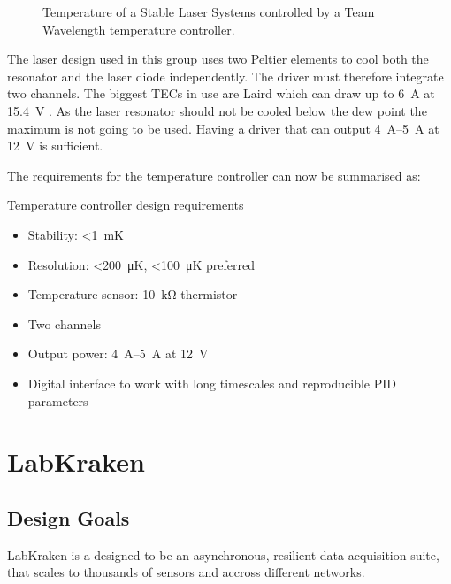 \begin{figure}[ht]
    \centering
    
    \caption{Temperature of a Stable Laser Systems  controlled by a Team Wavelength  temperature controller.}
    \label{fig:stability_cavity}
\end{figure}

The laser design used in this group uses two Peltier elements to cool both the resonator and the laser diode independently. The driver must therefore integrate two channels. The biggest TECs in use are Laird  which can draw up to \qty{6}{\A} at \qty{15.4}{\V} \cite{datasheet_tec}. As the laser resonator should not be cooled below the dew point the maximum is not going to be used. Having a driver that can output \qtyrange{4}{5}{\A} at \qty{12}{\V} is sufficient.

The requirements for the temperature controller can now be summarised as:

\begin{center}
    \begin{specifications}[label={lst:dgTemp_requirements}]{Temperature controller design requirements}
    \begin{itemize}
        \item Stability: \qty{<1}{\milli \K}
        \item Resolution: \qty{<200}{\micro \K}, \qty{<100}{\micro \K} preferred
        \item Temperature sensor: \qty{10}{\kilo \ohm} thermistor
        \item Two channels
        \item Output power: \qtyrange{4}{5}{\A} at \qty{12}{\V}
        \item Digital interface to work with long timescales and reproducible PID parameters
    \end{itemize}
    \end{specifications}
\end{center}

\clearpage
\section{LabKraken}%
\label{sec:prep_labkraken}
\subsection{Design Goals}
LabKraken is a designed to be an asynchronous, resilient data acquisition suite, that scales to thousands of sensors and accross different networks.
